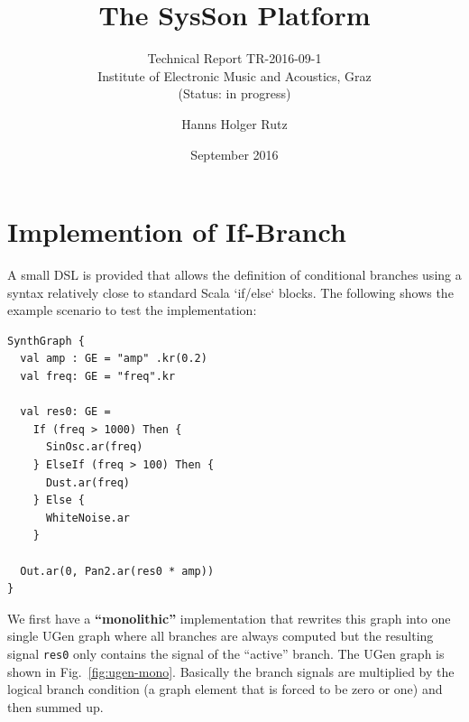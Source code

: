 \documentclass[11pt,a4paper]{article}
\title{The SysSon Platform}
\subtitle{Technical Report TR-2016-09-1\\Institute of Electronic Music and Acoustics, Graz\\(Status: in progress)}
\author{Hanns Holger Rutz}
\date{September 2016}
\newcommand{\figref}[1]{Fig.~\ref{#1}}
\begin{document}
\maketitle
{}
\thispagestyle{empty}
\newpage
\section{Implemention of If-Branch}

A small DSL is provided that allows the definition of conditional branches using a syntax relatively close to standard Scala `if/else` blocks. The following shows the example scenario to test the implementation:
%
\begin{verbatim}
SynthGraph {
  val amp : GE = "amp" .kr(0.2)
  val freq: GE = "freq".kr

  val res0: GE = 
    If (freq > 1000) Then {
      SinOsc.ar(freq)
    } ElseIf (freq > 100) Then {
      Dust.ar(freq)
    } Else {
      WhiteNoise.ar
    }

  Out.ar(0, Pan2.ar(res0 * amp))
}
\end{verbatim}
%
We first have a \textbf{``monolithic''} implementation that rewrites this graph into one single UGen graph where all branches are always computed but the resulting signal \Verb!res0! only contains the signal of the ``active'' branch. The UGen graph is shown in \figref{fig:ugen-mono}. Basically the branch signals are multiplied by the logical branch condition (a graph element that is forced to be zero or one) and then summed up.
\end{document}
